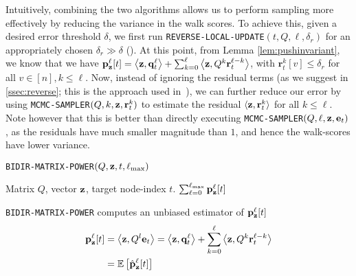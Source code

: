 Intuitively, combining the two algorithms allows us to perform sampling more effectively by reducing the variance in the walk scores.
To achieve this, given a desired error threshold $\delta$, we first run \texttt{REVERSE-LOCAL-UPDATE}$(t,Q,\ell,\delta_r)$ for an appropriately chosen $\delta_r\gg\delta$ (). 
At this point, from Lemma \ref{lem:pushinvariant}, we know that we have
${\mathbf{p}}_\mathbf{z}^{\ell}[t] = \left< \mathbf{z}, \mathbf{q}_t^{\ell} \right> + \sum_{k=0}^{\ell} \left<\mathbf{z}, Q^k\mathbf{r}_t^{\ell-k}\right>$, with $\mathbf{r}_t^{k}[v]\leq\delta_r$ for all $v\in[n],k\leq\ell$.
Now, instead of ignoring the residual terms (as we suggest in \ref{ssec:reverse}; this is the approach used in~\cite{andersen2007local,lee2014asynchronous}), we can further reduce our error by using \texttt{MCMC-SAMPLER}$(Q,k,\mathbf{z},\mathbf{r}_t^k)$ to estimate the residual $\langle\mathbf{z},\mathbf{r}_t^k\rangle$ for all $k\leq\ell$.
Note however that this is better than directly executing \texttt{MCMC-SAMPLER}$(Q,\ell,\mathbf{z},\mathbf{e}_{t})$, as the residuals have much smaller magnitude than $1$, and hence the walk-scores have lower variance.
\begin{algorithm}[ht]
\caption{\texttt{BIDIR-MATRIX-POWER}$(Q, \mathbf{z}, t,\ell_{\max})$}
\label{alg:linearsysest}
\begin{algorithmic}[1]
\REQUIRE Matrix $Q$, vector $\mathbf{z}$, target node-index $t$.
\ENDFOR
{}
\ENDFOR
\RETURN $\sum_{\ell=0}^{\ell_{\max}} {\mathbf{p}}_\mathbf{z}^{\ell}[t]$ 
\end{algorithmic}
\end{algorithm} 

\begin{lemma}
\texttt{BIDIR-MATRIX-POWER} computes an unbiased estimator of ${\mathbf{p}}_\mathbf{z}^{\ell}[t]$
\begin{align*}
{\mathbf{p}}_\mathbf{z}^{\ell}[t] &=  \left<\mathbf{z}, Q^l \mathbf{e}_t \right>= \left<\mathbf{z}, \mathbf{q}_t^{\ell} \right> + \sum_{k=0}^{\ell} \left<\mathbf{z} , Q^k\mathbf{r}_t^{\ell-k}\right>\\
&= \mathbb{E}\left[\hat{\mathbf{p}}_{\mathbf{z}}^{\ell}[t] \right]
\end{align*}
\end{lemma}

